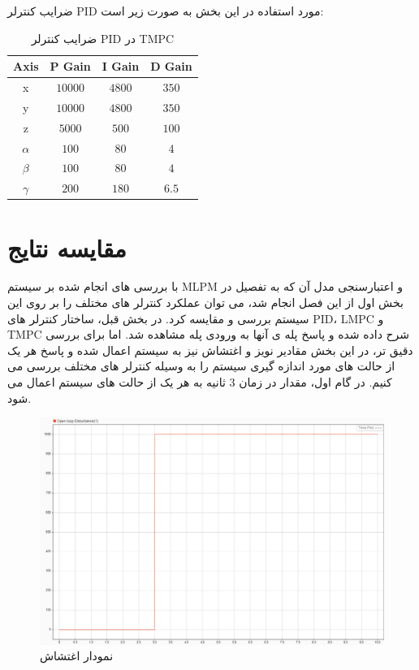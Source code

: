 ضرایب کنترلر PID مورد استفاده در این بخش به صورت زیر است:
\begin{table}[H]
	\centering
	\begin{tabular}{c|c|c|c}
		\hline
		\textbf{Axis} & \textbf{P Gain} & \textbf{I Gain} & \textbf{D Gain} \\
		\hline
		x & $10000$ & $4800$ & $350$ \\
		y & $10000$ & $4800$ & $350$ \\
		z & $5000$ & $500$ & $100$ \\
		$\alpha$ & $100$ & $80$ & $4$ \\
		$\beta$ & $100$ & $80$ & $4$ \\
		$\gamma$ & $200$ & $180$ & $6.5$ \\
		\hline
	\end{tabular}
	\caption{ضرایب کنترلر PID در TMPC}
	\label{tab:Tube_pid_gains}
\end{table}


\section{مقایسه نتایج}
با بررسی های انجام شده بر سیستم MLPM و اعتبارسنجی مدل آن که به تفصیل در بخش اول از این فصل انجام شد، می توان عملکرد کنترلر های مختلف را بر روی این سیستم بررسی و مقایسه کرد. در بخش قبل، ساختار کنترلر های PID، LMPC و TMPC شرح داده شده و پاسخ پله ی آنها به ورودی پله مشاهده شد. 
اما برای بررسی دقیق تر، در این بخش مقادیر نویز و اغتشاش نیز به سیستم اعمال شده و پاسخ هر یک از حالت های مورد اندازه گیری سیستم را به وسیله کنترلر های مختلف بررسی می کنیم.
در گام اول، مقدار در زمان 3 ثانیه به هر یک از حالت های سیستم اعمال می شود.
\begin{figure}[H]
	\centering
	\includegraphics[width=1\linewidth]{../img/Disturbance}
	\caption{نمودار اغتشاش}
	\label{fig:disturbance}
\end{figure}

